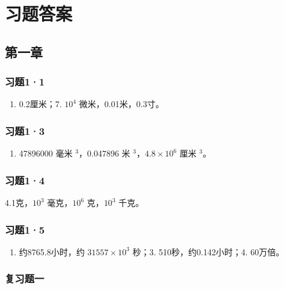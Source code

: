 \chapter{习题答案}\label{ux4e60ux9898ux7b54ux6848}

\section{第一章}\label{ux7b2cux4e00ux7ae0}

\subsection{习题1·1}\label{ux4e60ux989811-1}

\begin{enumerate}
\def\labelenumi{\arabic{enumi}.}
\setcounter{enumi}{4}
\tightlist
\item
  0.2厘米；7. \(10^{4}\) 微米，0.01米，0.3寸。
\end{enumerate}

\subsection{习题1·3}\label{ux4e60ux989813-1}

\begin{enumerate}
\def\labelenumi{\arabic{enumi}.}
\setcounter{enumi}{3}
\tightlist
\item
  47896000 毫米 \(^{3}\)，0.047896 米 \(^{3}\)，\(4.8 \times 10^{6}\)
  厘米 \(^{3}\)。
\end{enumerate}

\subsection{习题1·4}\label{ux4e60ux989814-1}

4.1克，\(10^{3}\) 毫克，\(10^{6}\) 克，\(10^{3}\) 千克。

\subsection{习题1·5}\label{ux4e60ux989815-1}

\begin{enumerate}
\def\labelenumi{\arabic{enumi}.}
\setcounter{enumi}{1}
\tightlist
\item
  约8765.8小时，约 \(31557 \times 10^{3}\) 秒；3. 510秒，约0.142小时；4.
  60万倍。
\end{enumerate}

\subsection{复习题一}\label{ux590dux4e60ux9898ux4e00-1}

